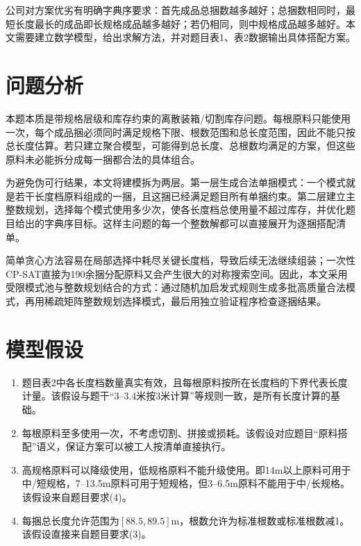 \documentclass[UTF8,a4paper,12pt]{ctexart}
\begin{document}
公司对方案优劣有明确字典序要求：首先成品总捆数越多越好；总捆数相同时，最短长度最长的成品即长规格成品越多越好；若仍相同，则中规格成品越多越好。本文需要建立数学模型，给出求解方法，并对题目表1、表2数据输出具体搭配方案。

\section{问题分析}
本题本质是带规格层级和库存约束的离散装箱/切割库存问题。每根原料只能使用一次，每个成品捆必须同时满足规格下限、根数范围和总长度范围，因此不能只按总长度估算。若只建立聚合模型，可能得到总长度、总根数均满足的方案，但这些原料未必能拆分成每一捆都合法的具体组合。

为避免伪可行结果，本文将建模拆为两层。第一层生成合法单捆模式：一个模式就是若干长度档原料组成的一捆，且这捆已经满足题目所有单捆约束。第二层建立主整数规划，选择每个模式使用多少次，使各长度档总使用量不超过库存，并优化题目给出的字典序目标。这样主问题的每一个整数解都可以直接展开为逐捆搭配清单。

简单贪心方法容易在局部选择中耗尽关键长度档，导致后续无法继续组装；一次性CP-SAT直接为190余捆分配原料又会产生很大的对称搜索空间。因此，本文采用受限模式池与整数规划结合的方式：通过随机加启发式规则生成多批高质量合法模式，再用稀疏矩阵整数规划选择模式，最后用独立验证程序检查逐捆结果。

\section{模型假设}
\begin{enumerate}[label=\arabic*)]
  \item 题目表2中各长度档数量真实有效，且每根原料按所在长度档的下界代表长度计量。该假设与题干“3--3.4米按3米计算”等规则一致，是所有长度计算的基础。
  \item 每根原料至多使用一次，不考虑切割、拼接或损耗。该假设对应题目“原料搭配”语义，保证方案可以被工人按清单直接执行。
  \item 高规格原料可以降级使用，低规格原料不能升级使用。即14m以上原料可用于中/短规格，7--13.5m原料可用于短规格，但3--6.5m原料不能用于中/长规格。该假设来自题目要求(4)。
  \item 每捆总长度允许范围为$[88.5,89.5]$m，根数允许为标准根数或标准根数减1。该假设直接来自题目要求(3)。
\end{enumerate}
\end{document}
